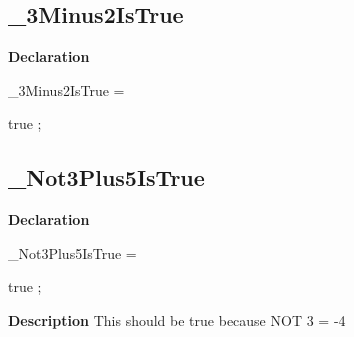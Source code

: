 \documentclass{report}
\newif\ifpdf
\begin{document}
\subsection*{{\_}3Minus2IsTrue}
\fi
\label{ok_if_expressions_2-_3Minus2IsTrue}
\begin{list}{}{
\setlength{\itemindent}{0cm}
\setlength{\listparindent}{0cm}
\setlength{\leftmargin}{\evensidemargin}
\addtolength{\leftmargin}{\tmplength}
\settowidth{\labelsep}{X}
\addtolength{\leftmargin}{\labelsep}
\setlength{\labelwidth}{\tmplength}
}
\item[\textbf{Declaration}\hfill]
\ifpdf
\begin{flushleft}
\fi
\begin{ttfamily}
{\_}3Minus2IsTrue =

true
;\end{ttfamily}

\ifpdf
\end{flushleft}
\fi

\end{list}
\ifpdf
\subsection*{\large{\textbf{{\_}Not3Plus5IsTrue}}\normalsize\hspace{1ex}\hrulefill}
\else
\subsection*{{\_}Not3Plus5IsTrue}
\fi
\label{ok_if_expressions_2-_Not3Plus5IsTrue}
\begin{list}{}{
\setlength{\itemindent}{0cm}
\setlength{\listparindent}{0cm}
\setlength{\leftmargin}{\evensidemargin}
\addtolength{\leftmargin}{\tmplength}
\settowidth{\labelsep}{X}
\addtolength{\leftmargin}{\labelsep}
\setlength{\labelwidth}{\tmplength}
}
\item[\textbf{Declaration}\hfill]
\ifpdf
\begin{flushleft}
\fi
\begin{ttfamily}
{\_}Not3Plus5IsTrue =

true
;\end{ttfamily}

\ifpdf
\end{flushleft}
\fi

\par
\item[\textbf{Description}]
This should be true because NOT 3 = {-}4

\end{list}
\ifpdf
\end{document}
